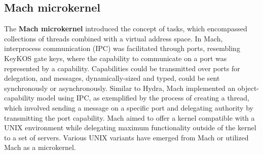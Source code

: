 \subsection{Mach microkernel}
The \textbf{Mach microkernel}\cite{rashid_mach_nodate} introduced the concept of tasks, which encompassed collections of threads 
combined with a virtual address space. In Mach, interprocess communication (IPC) was facilitated through 
ports, resembling KeyKOS gate keys, where the capability to communicate on a port was represented by a 
capability. Capabilities could be transmitted over ports for delegation, and messages, dynamically-sized 
and typed, could be sent synchronously or asynchronously. Similar to Hydra, Mach implemented an object-capability 
model using IPC, as exemplified by the process of creating a thread, which involved sending a message on a specific 
port and delegating authority by transmitting the port capability. Mach aimed to offer a kernel compatible with a 
UNIX environment while delegating maximum functionality outside of the kernel to a set of servers. Various 
UNIX variants have emerged from Mach or utilized Mach as a microkernel.
\newline


